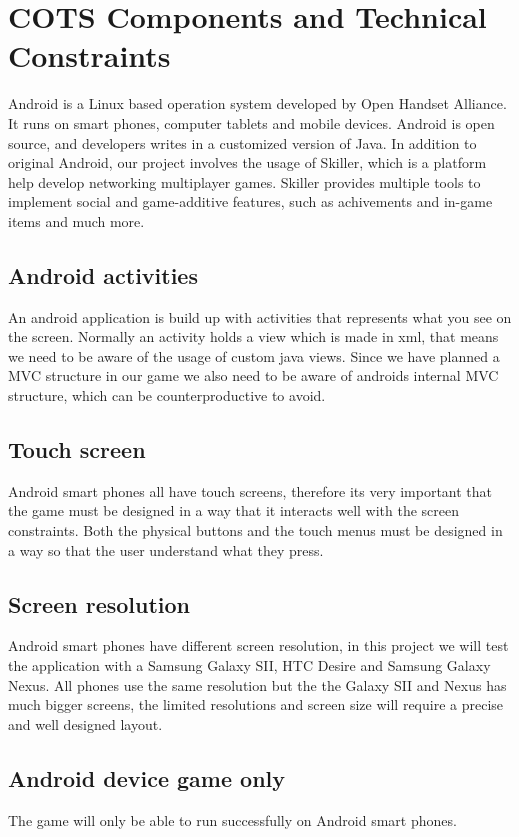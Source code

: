 \section{COTS Components and Technical Constraints}
Android \cite{Android} is a Linux based operation system developed by Open Handset Alliance. It runs on smart phones, computer tablets and mobile devices. Android is open source, and developers writes in a customized version of Java\cite{sdk}. In addition to original Android, our project involves the usage of Skiller\cite{Skiller}, which is a platform help develop networking multiplayer games. Skiller provides multiple tools to implement social and game-additive features, such as achivements and in-game items and much more.

\subsection{Android activities}
An android application is build up with activities that represents what you see on the screen. Normally an activity holds a view which is made in xml, that means we need to be aware of the usage of custom java views. Since we have planned a MVC structure in our game we also need to be aware of androids internal MVC structure, which can be counterproductive to avoid.

\subsection{Touch screen}
Android smart phones all have touch screens, therefore its very important that the game must be designed in a way that it interacts well with the screen constraints. Both the physical buttons and the touch menus must be designed in a way so that the user understand what they press.

\subsection{Screen resolution}
Android smart phones have different screen resolution, in this project we will test the application with a Samsung Galaxy SII, HTC Desire and Samsung Galaxy Nexus. All phones use the same resolution but the the Galaxy SII and Nexus has much bigger screens, the limited resolutions and screen size will require a precise and well designed layout.

\subsection{Android device game only}
The game will only be able to run successfully on Android smart phones.



